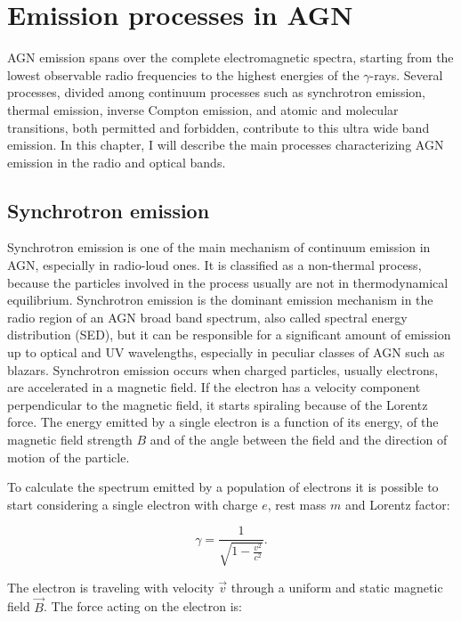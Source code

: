 \documentclass[../main.tex]{subfiles}
\begin{document}
\chapter{Emission processes in AGN}
\label{cap:emission}

AGN emission spans over the complete electromagnetic spectra, starting from the lowest observable radio frequencies to the highest energies of the $\gamma$-rays.
Several processes, divided among continuum processes such as synchrotron emission, thermal emission, inverse Compton emission, and atomic and molecular transitions, both permitted and forbidden, contribute to this ultra wide band emission.
In this chapter, I will describe the main processes characterizing AGN emission in the radio and optical bands.

\section{Synchrotron emission}
\label{sec:synchrotron}

Synchrotron emission is one of the main mechanism of continuum emission in AGN, especially in radio-loud ones.
It is classified as a non-thermal process, because the particles involved in the process usually are not in thermodynamical equilibrium.
Synchrotron emission is the dominant emission mechanism in the radio region of an AGN broad band spectrum, also called spectral energy distribution (SED), but it can be responsible for a significant amount of emission up to optical and UV wavelengths, especially in peculiar classes of AGN such as blazars.
Synchrotron emission occurs when charged particles, usually electrons, are accelerated in a magnetic field.
If the electron has a velocity component perpendicular to the magnetic field, it starts spiraling because of the Lorentz force.
The energy emitted by a single electron is a function of its energy, of the magnetic field strength $B$ and of the angle between the field and the direction of motion of the particle.

To calculate the spectrum emitted by a population of electrons it is possible to start considering a single electron with charge $e$, rest mass $m$ and Lorentz factor:

\begin{equation}
    \label{eq:lorentz}
    \gamma = \frac{1}{\sqrt{1-\frac{v^2}{c^2}}}.
\end{equation}

The electron is traveling with velocity $\vec{v}$ through a uniform and static magnetic field $\vec{B}$.
The force acting on the electron is:
\end{document}

